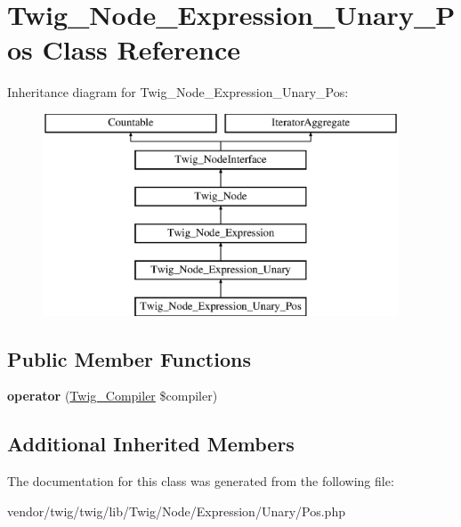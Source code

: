 \hypertarget{classTwig__Node__Expression__Unary__Pos}{}\section{Twig\+\_\+\+Node\+\_\+\+Expression\+\_\+\+Unary\+\_\+\+Pos Class Reference}
\label{classTwig__Node__Expression__Unary__Pos}
Inheritance diagram for Twig\+\_\+\+Node\+\_\+\+Expression\+\_\+\+Unary\+\_\+\+Pos\+:\begin{figure}[H]
\begin{center}
\leavevmode
\includegraphics[height=6.000000cm]{classTwig__Node__Expression__Unary__Pos}
\end{center}
\end{figure}
\subsection*{Public Member Functions}
\begin{DoxyCompactItemize}
\item 
{\bfseries operator} (\hyperlink{classTwig__Compiler}{Twig\+\_\+\+Compiler} \$compiler)\hypertarget{classTwig__Node__Expression__Unary__Pos_a4d26763ec0bd74b5c1fda07cf66dfd54}{}\label{classTwig__Node__Expression__Unary__Pos_a4d26763ec0bd74b5c1fda07cf66dfd54}

\end{DoxyCompactItemize}
\subsection*{Additional Inherited Members}


The documentation for this class was generated from the following file\+:\begin{DoxyCompactItemize}
\item 
vendor/twig/twig/lib/\+Twig/\+Node/\+Expression/\+Unary/Pos.\+php\end{DoxyCompactItemize}
